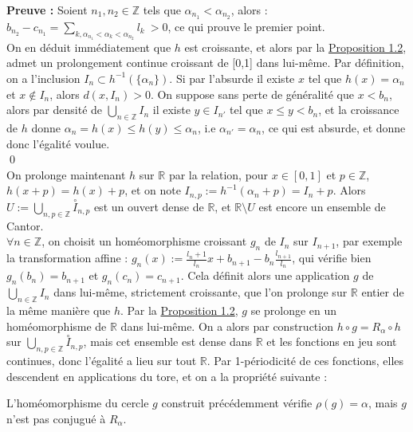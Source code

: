 \documentclass[11pt,a4paper]{article}
\begin{document}
\textbf{Preuve :} Soient $n_1,n_2 \in \mathbb{Z}$ tels que $\alpha_{n_1} < \alpha_{n_2}$, alors : $b_{n_2} - c_{n_1} = \displaystyle \sum_{k, \alpha_{n_1} < \alpha_k < \alpha_{n_2}} l_k \  > 0$, ce qui prouve le premier point. \\
On en déduit immédiatement que $h$ est croissante, et alors par la \hyperref[prop:dense]{Proposition 1.2}, admet un prolongement continue croissant de [0,1] dans lui-même. Par définition, on a l'inclusion $I_n \subset h^{-1}(\{\alpha_n\})$. Si par l'absurde il existe $x$ tel que $h(x)=\alpha_n$ et $x \notin I_n$, alors $d(x,I_n) >0$. On suppose sans perte de généralité que $x<b_n$, alors par densité de $\displaystyle \bigcup_{n\in \mathbb{Z}} I_n$ il existe $y\in I_{n'}$ tel que $x\leq y < b_n$, et la croissance de $h$ donne $\alpha_n = h(x) \leq h(y) \leq \alpha_n$, i.e $\alpha_{n'} = \alpha_n$, ce qui est absurde, et donne donc l'égalité voulue. \\ \qed \\

On prolonge maintenant $h$ sur $\mathbb{R}$ par la relation, pour $x\in [0,1]$ et $p\in \mathbb{Z}$, $h(x+p)=h(x)+p$, et on note $I_{n,p}:=h^{-1}(\alpha_n+p)=I_n + p$. Alors $\displaystyle U:= \bigcup_{n,p \in \mathbb{Z}} \overset{\circ}I_{n,p}$ est un ouvert dense de $\mathbb{R}$, et $\mathbb{R}\setminus U$ est encore un ensemble de Cantor. \\

$\forall n \in \mathbb{Z}$, on choisit un homéomorphisme croissant $g_n$ de $I_n$ sur $I_{n+1}$, par exemple la transformation affine : $g_n(x) := \displaystyle \frac{l_n+1}{l_n}x + b_{n+1}-b_n\frac{l_{n+1}}{l_n}$, qui vérifie bien $g_n(b_n)=b_{n+1}$ et $g_n(c_n)=c_{n+1}$. Cela définit alors une application $g$ de $\displaystyle \bigcup_{n\in \mathbb{Z}} I_n$ dans lui-même, strictement croissante, que l'on prolonge sur $\mathbb{R}$ entier de la même manière que $h$. Par la \hyperref[prop:dense]{Proposition 1.2}, $g$ se prolonge en un homéomorphisme de $\mathbb{R}$ dans lui-même. On a alors par construction $h \circ g = R_\alpha \circ h$ sur $\displaystyle \bigcup_{n,p \in \mathbb{Z}} \overset{\circ}I_{n,p}$, mais cet ensemble est dense dans $\mathbb{R}$ et les fonctions en jeu sont continues, donc l'égalité a lieu sur tout $\mathbb{R}$. Par 1-périodicité de ces fonctions, elles descendent en applications du tore, et on a la propriété suivante : \\

\label{th:cont}
\begin{theorem}
L'homéomorphisme du cercle $g$ construit précédemment vérifie $\rho(g)=\alpha$, mais $g$ n'est pas conjugué à $R_\alpha$.
\end{theorem}
\end{document}
